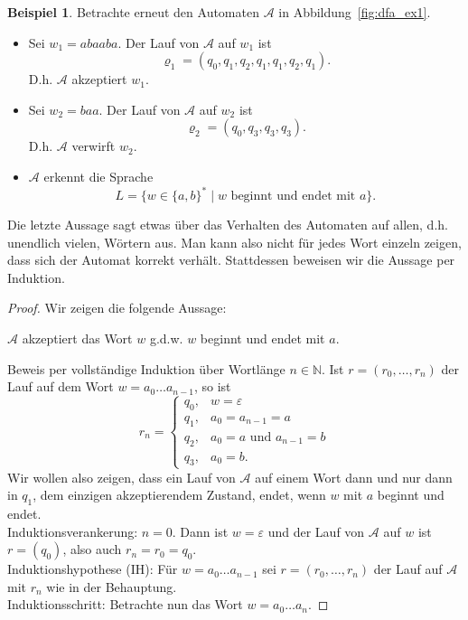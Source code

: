 \documentclass[11pt, a4paper]{article}
\theoremstyle{definition}
\newtheorem{example}[definition]{Beispiel}
\theoremstyle{plain}
\numberwithin{equation}{section}
\begin{document}
\begin{example}\label{exp:ex1}
	Betrachte erneut den Automaten $\mathcal{A}$ in Abbildung~\ref{fig:dfa_ex1}.
	\begin{itemize}
		\item Sei $w_1 = abaaba$. Der Lauf von $\mathcal{A}$ auf $w_1$ ist
			$$
				\varrho_1 = (q_0, q_1, q_2, q_1, q_1, q_2, q_1).
			$$
			D.h. $\mathcal{A}$ akzeptiert $w_1$.
		\item Sei $w_2 = baa$. Der Lauf von $\mathcal{A}$ auf $w_2$ ist
			$$
				\varrho_2 = (q_0, q_3, q_3, q_3).
			$$
			D.h. $\mathcal{A}$ verwirft $w_2$.
		\item $\mathcal{A}$ erkennt die Sprache 
			$$
				L = \{ w \in \{a, b\}^\ast \mid w \text{ beginnt und endet mit } a \}.
			$$
	\end{itemize}
	Die letzte Aussage sagt etwas über das Verhalten des Automaten auf allen, d.h. unendlich vielen, Wörtern aus. Man kann also nicht für jedes Wort einzeln zeigen, dass sich der Automat korrekt verhält. Stattdessen beweisen wir die Aussage per Induktion.
	\begin{proof}
		Wir zeigen die folgende Aussage:
		\begin{center}
			$\mathcal{A}$ akzeptiert das Wort $w$ {g.d.w.} $w$ beginnt und endet mit $a$.				\end{center}
		Beweis per vollständige Induktion über Wortlänge $n \in \mathbb{N}$. Ist $r = (r_0, \ldots, r_n)$ der Lauf auf dem Wort $w = a_0 \ldots a_{n-1}$, so ist
		$$
			r_n = \left\lbrace 
					\begin{array}{ll}
						q_0, & w = \varepsilon\\
						q_1, & a_0 = a_{n-1} = a\\
						q_2, & a_0 = a \text{ und } a_{n-1} = b\\
						q_3, & a_0 = b.
					\end{array}
				\right.
		$$
		Wir wollen also zeigen, dass ein Lauf von $\mathcal{A}$ auf einem Wort dann und nur dann in $q_1$, dem einzigen akzeptierendem Zustand, endet, wenn $w$ mit $a$ beginnt und endet.\\
		Induktionsverankerung: $n = 0$. Dann ist $w = \varepsilon$ und der Lauf von $\mathcal{A}$ auf $w$ ist $r = (q_0)$, also auch $r_n = r_0 = q_0$.\checkmark\\
		Induktionshypothese (IH): Für $w = a_0 \ldots a_{n-1}$ sei $r = (r_0, \ldots, r_n)$ der Lauf auf $\mathcal{A}$ mit $r_n$ wie in der Behauptung.\\
		Induktionsschritt: Betrachte nun das Wort $w = a_0 \ldots a_n$.

\end{proof}
\end{example}
\end{document}
